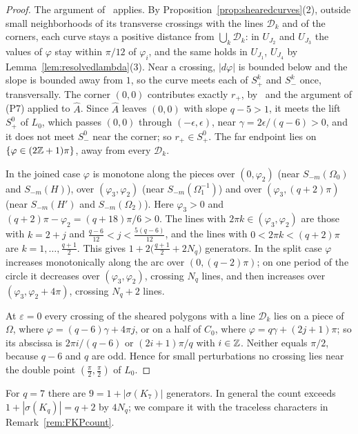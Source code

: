 \begin{proof}
The argument of~\cite[Prop.~6.3]{WuebbenV} applies. By Proposition~\ref{prop:shearedcurves}(2), outside small neighborhoods
of its transverse crossings with the lines $\mathcal D_k$ and of the corners, each curve stays a positive distance from
$\bigcup_k\mathcal D_k$: in $U_{J_2}$ and $U_{J_3}$ the values of $\varphi$ stay within $\pi/12$ of $\varphi_i$, and the same holds in
$U_{J_1}$, $U_{J_4}$ by Lemma~\ref{lem:resolvedlambda}(3). Near a crossing, $|d\varphi|$ is bounded below and the slope is
bounded away from $1$, so the curve meets each of $S^k_+$ and $S^k_-$ once, transversally. The corner $(0,0)$ contributes
exactly $r_+$, by~\cite[Lemma~5.1]{HHK2} and the argument of (P7) applied to $\hat A$. Since $\hat A$ leaves $(0,0)$ with
slope $q-5>1$, it meets the lift $S^0_+$ of $L_0$, which passes $(0,0)$ through $(-\epsilon,\epsilon)$, near $\gamma=2\epsilon/(q-6)>0$, and it does not meet $S^0_-$ near
the corner; so $r_+\in S^0_+$. The far endpoint lies on $\{\varphi\in(2\mathbb{Z}+1)\pi\}$, away from every $\mathcal D_k$.

In the joined case $\varphi$ is monotone along the pieces over $(0,\varphi_2)$ (near $S_{-m}(\Omega_0)$ and $S_{-m}(H)$), over $(\varphi_3,\varphi_2)$
(near $S_{-m}(\Omega_1^{-1})$) and over $(\varphi_3,(q+2)\pi)$ (near $S_{-m}(H')$ and $S_{-m}(\Omega_2)$). Here $\varphi_3>0$ and $(q+2)\pi-\varphi_2=(q+18)\pi/6>0$.
The lines with $2\pi k\in(\varphi_3,\varphi_2)$ are those with $k=2+j$ and $\frac{q-6}{12}<j<\frac{5(q-6)}{12}$, and the lines with
$0<2\pi k<(q+2)\pi$ are $k=1,\dots,\frac{q+1}2$. This gives $1+2\bigl(\frac{q+1}2+2N_q\bigr)$ generators. In the split case
$\varphi$ increases monotonically along the arc over $(0,(q-2)\pi)$; on one period of the circle it decreases over
$(\varphi_3,\varphi_2)$, crossing $N_q$ lines, and then increases over $(\varphi_3,\varphi_2+4\pi)$, crossing $N_q+2$ lines.

At $\varepsilon=0$ every crossing of the sheared polygons with a line $\mathcal D_k$ lies on a piece of $\Omega$, where $\varphi=(q-6)\gamma+4\pi j$,
or on a half of $C_0$, where $\varphi=q\gamma+(2j+1)\pi$; so its abscissa is $2\pi i/(q-6)$ or $(2i+1)\pi/q$ with $i\in\mathbb{Z}$. Neither
equals $\pi/2$, because $q-6$ and $q$ are odd. Hence for small perturbations no crossing lies near the double point
$(\frac\pi2,\frac\pi2)$ of $L_0$.
\end{proof}

For $q=7$ there are $9=1+|\sigma(K_7)|$ generators. In general the count exceeds $1+|\sigma(K_q)|=q+2$ by $4N_q$; we compare it
with the traceless characters in Remark~\ref{rem:FKPcount}.

